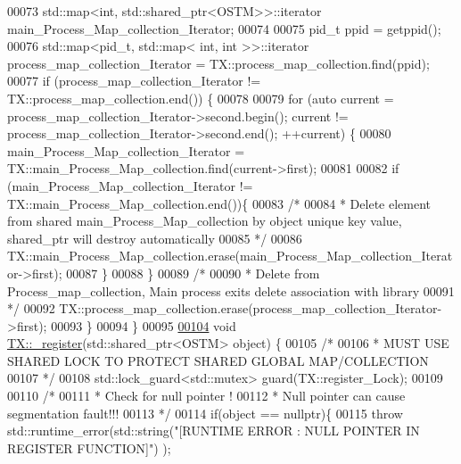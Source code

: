 \begin{DoxyCode}
00073     std::map<int, std::shared\_ptr<OSTM>>::iterator main\_Process\_Map\_collection\_Iterator;
00074      
00075     pid\_t ppid = getppid();
00076     std::map<pid\_t, std::map< int, int >>::iterator process\_map\_collection\_Iterator = 
      TX::process\_map\_collection.find(ppid);
00077     \textcolor{keywordflow}{if} (process\_map\_collection\_Iterator != TX::process\_map\_collection.end()) \{
00078 
00079         \textcolor{keywordflow}{for} (\textcolor{keyword}{auto} current = process\_map\_collection\_Iterator->second.begin(); current != 
      process\_map\_collection\_Iterator->second.end(); ++current) \{
00080             main\_Process\_Map\_collection\_Iterator = TX::main\_Process\_Map\_collection.find(current->first);
00081 
00082             \textcolor{keywordflow}{if} (main\_Process\_Map\_collection\_Iterator != TX::main\_Process\_Map\_collection.end())\{
00083                 \textcolor{comment}{/*}
00084 \textcolor{comment}{                 * Delete element from shared main\_Process\_Map\_collection by object unique key value,
       shared\_ptr will destroy automatically}
00085 \textcolor{comment}{                 */}
00086                 TX::main\_Process\_Map\_collection.erase(main\_Process\_Map\_collection\_Iterator->first);      
00087             \}
00088         \}
00089         \textcolor{comment}{/*}
00090 \textcolor{comment}{         * Delete from Process\_map\_collection, Main process exits delete association with library}
00091 \textcolor{comment}{         */}
00092         TX::process\_map\_collection.erase(process\_map\_collection\_Iterator->first);
00093     \}
00094 \}
00095 
\hypertarget{_t_x_8cpp_source.tex_l00104}{}\hyperlink{class_t_x_abc32af2f51df97ac483e5bfe7db6ca6e}{00104} \textcolor{keywordtype}{void} \hyperlink{class_t_x_abc32af2f51df97ac483e5bfe7db6ca6e}{TX::\_register}(std::shared\_ptr<OSTM> \textcolor{keywordtype}{object}) \{
00105     \textcolor{comment}{/*}
00106 \textcolor{comment}{     * MUST USE SHARED LOCK TO PROTECT SHARED GLOBAL MAP/COLLECTION }
00107 \textcolor{comment}{     */}
00108     std::lock\_guard<std::mutex> guard(TX::register\_Lock);
00109     
00110     \textcolor{comment}{/*}
00111 \textcolor{comment}{     * Check for null pointer !}
00112 \textcolor{comment}{     * Null pointer can cause segmentation fault!!!}
00113 \textcolor{comment}{     */}
00114     \textcolor{keywordflow}{if}(\textcolor{keywordtype}{object} == \textcolor{keyword}{nullptr})\{
00115         \textcolor{keywordflow}{throw} std::runtime\_error(std::string(\textcolor{stringliteral}{"[RUNTIME ERROR : NULL POINTER IN REGISTER FUNCTION]"}) );

\end{DoxyCode}
